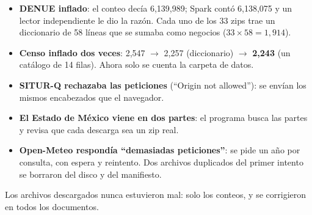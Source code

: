 \begin{error}
\begin{itemize}
\item \textbf{DENUE inflado}: el conteo decía 6,139,989; Spark contó 6,138,075 y un lector independiente le dio la razón.
  Cada uno de los 33 zips trae un diccionario de 58 líneas que se sumaba como negocios ($33\times58=1{,}914$).
\item \textbf{Censo inflado dos veces}: 2,547 $\to$ 2,257 (diccionario) $\to$ \textbf{2,243} (un catálogo de 14 filas). Ahora
  solo se cuenta la carpeta de datos.
\item \textbf{SITUR-Q rechazaba las peticiones} (``Origin not allowed''): se envían los mismos encabezados que el navegador.
\item \textbf{El Estado de México viene en dos partes}: el programa busca las partes y revisa que cada descarga sea un zip
  real.
\item \textbf{Open-Meteo respondía ``demasiadas peticiones''}: se pide un año por consulta, con espera y reintento. Dos
  archivos duplicados del primer intento se borraron del disco y del manifiesto.
\end{itemize}
Los archivos descargados nunca estuvieron mal: solo los conteos, y se corrigieron en todos los documentos.
\end{error}
